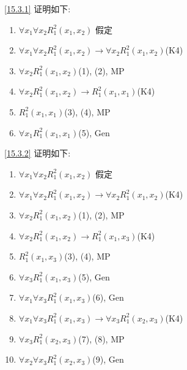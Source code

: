 \documentclass[boxes]{homework}
\begin{document}
\begin{solution}
    \ref{15.3.1} 证明如下:
    \begin{enumerate}[label = (\arabic*), parsep = 0pt, itemsep = 0pt, topsep = .25em]
        \item $\forall x_1\forall x_2 R_1^2(x_1, x_2)$ \hfill 假定
        \item $\forall x_1\forall x_2 R_1^2(x_1, x_2)\to \forall x_2 R_1^2(x_1, x_2)$\hfill (K4)
        \item $\forall x_2 R_1^2(x_1, x_2)$\hfill (1), (2), MP
        \item $\forall x_2 R_1^2(x_1, x_2)\to R_1^2(x_1, x_1)$\hfill (K4)
        \item $R_1^2(x_1, x_1)$\hfill (3), (4), MP
        \item $\forall x_1 R_1^2(x_1, x_1)$\hfill (5), Gen
    \end{enumerate}
    \ref{15.3.2} 证明如下:
    \begin{enumerate}[label = (\arabic*), parsep = 0pt, itemsep = 0pt, topsep = .25em]
        \item $\forall x_1\forall x_2 R_1^2(x_1, x_2)$ \hfill 假定
        \item $\forall x_1\forall x_2 R_1^2(x_1, x_2)\to \forall x_2 R_1^2(x_1, x_2)$\hfill (K4)
        \item $\forall x_2 R_1^2(x_1, x_2)$\hfill (1), (2), MP
        \item $\forall x_2 R_1^2(x_1, x_2)\to R_1^2(x_1, x_3)$\hfill (K4)
        \item $R_1^2(x_1, x_3)$\hfill (3), (4), MP
        \item $\forall x_3 R_1^2(x_1, x_3)$\hfill (5), Gen
        \item $\forall x_1\forall x_3 R_1^2(x_1, x_3)$\hfill (6), Gen
        \item $\forall x_1\forall x_3 R_1^2(x_1, x_3)\to \forall x_3 R_1^2(x_2, x_3)$\hfill (K4)
        \item $\forall x_3 R_1^2(x_2, x_3)$\hfill (7), (8), MP
        \item $\forall x_2\forall x_3 R_1^2(x_2, x_3)$\hfill (9), Gen
    \end{enumerate}
\end{solution}
\end{document}
